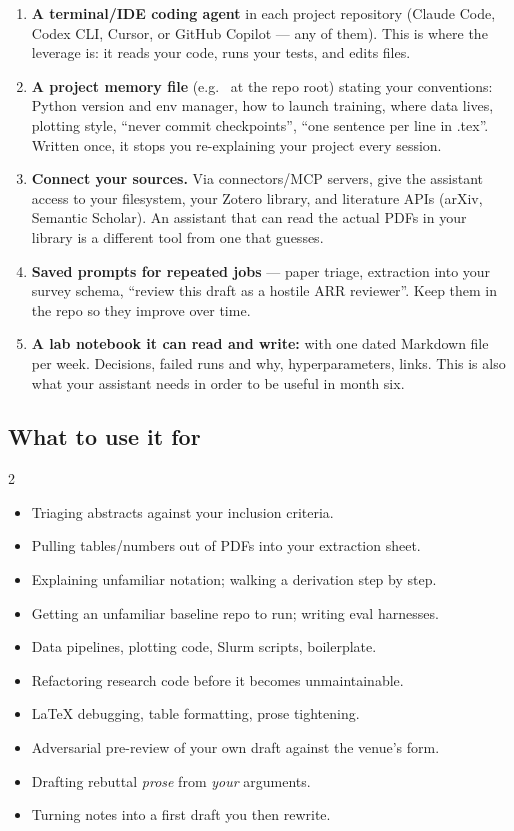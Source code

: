 \documentclass[11pt,a4paper]{article}
\begin{document}
\begin{enumerate}
  \item \textbf{A terminal/IDE coding agent} in each project repository
        (Claude Code, Codex CLI, Cursor, or GitHub Copilot --- any of them).
        This is where the leverage
        is: it reads your code, runs your tests, and edits files.
  \item \textbf{A project memory file} (e.g.\  at the repo
        root) stating your conventions: Python version and env manager, how to
        launch training, where data lives, plotting style, ``never commit
        checkpoints'', ``one sentence per line in .tex''. Written once, it
        stops you re-explaining your project every session.
  \item \textbf{Connect your sources.} Via connectors/MCP servers, give the
        assistant access to your filesystem, your Zotero library, and
        literature APIs (arXiv, Semantic Scholar). An assistant that can read
        the actual PDFs in your library is a different tool from one that
        guesses.
  \item \textbf{Saved prompts for repeated jobs} --- paper triage, extraction
        into your survey schema, ``review this draft as a hostile ARR
        reviewer''. Keep them in the repo so they improve over time.
  \item \textbf{A lab notebook it can read and write:}  with one
        dated Markdown file per week. Decisions, failed runs and why,
        hyperparameters, links. This is also what your assistant needs in
        order to be useful in month six.
\end{enumerate}

\subsection{What to use it for}

\begin{multicols}{2}
\begin{itemize}
  \item Triaging abstracts against your inclusion criteria.
  \item Pulling tables/numbers out of PDFs into your extraction sheet.
  \item Explaining unfamiliar notation; walking a derivation step by step.
  \item Getting an unfamiliar baseline repo to run; writing eval harnesses.
  \item Data pipelines, plotting code, Slurm scripts, boilerplate.
  \item Refactoring research code before it becomes unmaintainable.
  \item LaTeX debugging, table formatting, prose tightening.
  \item Adversarial pre-review of your own draft against the venue's form.
  \item Drafting rebuttal \emph{prose} from \emph{your} arguments.
  \item Turning notes into a first draft you then rewrite.
\end{itemize}
\end{multicols}
\end{document}
